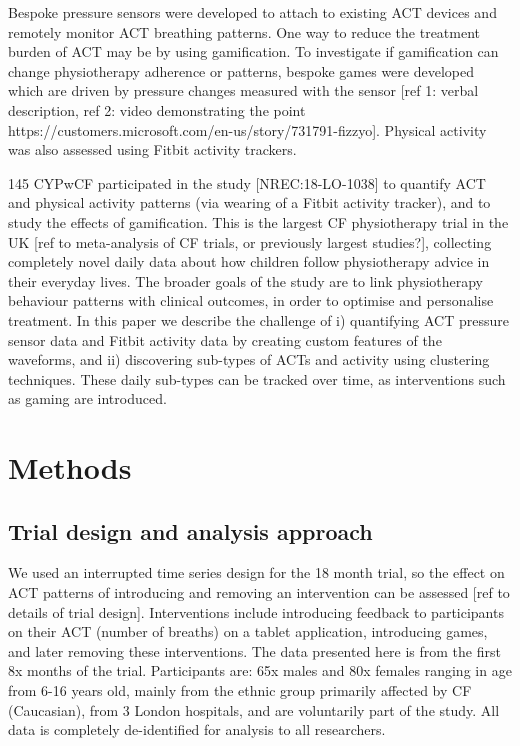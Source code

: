 \documentclass{article}
\begin{document}
Bespoke pressure sensors were developed to attach to existing ACT devices and remotely monitor ACT breathing patterns. One way to reduce the treatment burden of ACT may be by using gamification. To investigate if gamification can change physiotherapy adherence or patterns, bespoke games were developed which are driven by pressure changes measured with the sensor [ref 1: verbal description, ref 2: video demonstrating the point https://customers.microsoft.com/en-us/story/731791-fizzyo]. Physical activity was also assessed using Fitbit activity trackers. 

 145 CYPwCF participated in the study [NREC:18-LO-1038] to quantify ACT and physical activity patterns (via wearing of a Fitbit activity tracker), and to study the effects of gamification. This is the largest CF physiotherapy trial in the UK [ref to meta-analysis of CF trials, or previously largest studies?], collecting completely novel daily data about how children follow physiotherapy advice in their everyday lives. The broader goals of the study are to link physiotherapy behaviour patterns with clinical outcomes, in order to optimise and personalise treatment. In this paper we describe the challenge of i) quantifying ACT pressure sensor data and Fitbit activity data by creating custom features of the waveforms, and ii) discovering sub-types of ACTs and activity using clustering techniques. These daily sub-types can be tracked over time, as interventions such as gaming are introduced.   
\section{Methods}
\subsection{Trial design and analysis approach}
We used an interrupted time series design for the 18 month trial, so the effect on ACT patterns of introducing and removing an intervention can be assessed [ref to details of trial design]. Interventions include introducing feedback to participants on their ACT (number of breaths) on a tablet application, introducing games, and later removing these interventions. The data presented here is from the first 8x months of the trial. Participants are: 65x males and 80x females ranging in age from 6-16 years old, mainly from the ethnic group primarily affected by CF (Caucasian), from 3 London hospitals, and are voluntarily part of the study. All data is completely de-identified for analysis to all researchers. 
 
\end{document}
